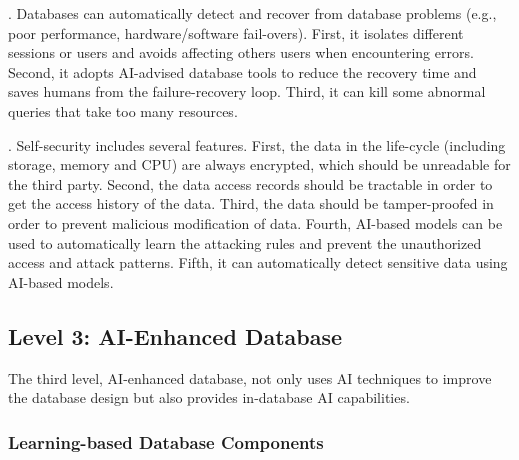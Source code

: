 . Databases can automatically detect and recover from database problems (e.g., poor performance, hardware/software fail-overs). First, it isolates different sessions or users and avoids affecting others users when encountering errors. Second, it adopts AI-advised database tools to reduce the recovery time and saves humans from the failure-recovery loop. Third, it can kill some abnormal queries that take too many resources. 


. Self-security includes several features. First, the data in the life-cycle (including storage, memory and CPU) are always encrypted, which should be unreadable for the third party. Second, the data access records should be tractable in order to get the access  history of the data. Third, the data should be tamper-proofed in order to prevent malicious modification of data. Fourth, AI-based models can be used to automatically learn the attacking rules and prevent the unauthorized access and attack patterns. Fifth, it can automatically detect sensitive data using AI-based models. 


\subsection{Level 3: AI-Enhanced Database}
\label{subsec: enhanced}

The third level, AI-enhanced database, not only uses AI techniques to improve the database design but also provides in-database AI capabilities. 


\subsubsection{Learning-based Database Components}
\label{subsubsec: intelligent}

